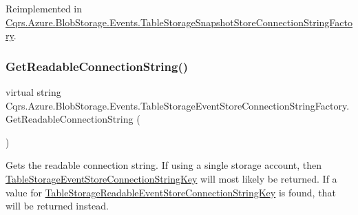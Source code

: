 Reimplemented in \hyperlink{classCqrs_1_1Azure_1_1BlobStorage_1_1Events_1_1TableStorageSnapshotStoreConnectionStringFactory_af0ddf382c977759aa45d3971fb21cbed_af0ddf382c977759aa45d3971fb21cbed}{Cqrs.\+Azure.\+Blob\+Storage.\+Events.\+Table\+Storage\+Snapshot\+Store\+Connection\+String\+Factory}.

\mbox{\label{classCqrs_1_1Azure_1_1BlobStorage_1_1Events_1_1TableStorageEventStoreConnectionStringFactory_a047e58aa30e97231dc913df350bc2446_a047e58aa30e97231dc913df350bc2446}} 
\subsubsection{\texorpdfstring{Get\+Readable\+Connection\+String()}{GetReadableConnectionString()}}
{\footnotesize\ttfamily virtual string Cqrs.\+Azure.\+Blob\+Storage.\+Events.\+Table\+Storage\+Event\+Store\+Connection\+String\+Factory.\+Get\+Readable\+Connection\+String (\begin{DoxyParamCaption}{ }\end{DoxyParamCaption})\hspace{0.3cm}{\ttfamily [virtual]}}



Gets the readable connection string. If using a single storage account, then \hyperlink{classCqrs_1_1Azure_1_1BlobStorage_1_1Events_1_1TableStorageEventStoreConnectionStringFactory_a95f8662029c8a40117e326973de936bf_a95f8662029c8a40117e326973de936bf}{Table\+Storage\+Event\+Store\+Connection\+String\+Key} will most likely be returned. If a value for \hyperlink{classCqrs_1_1Azure_1_1BlobStorage_1_1Events_1_1TableStorageEventStoreConnectionStringFactory_ac28aea2439fe0bed85d1b53c0fd8fdaf_ac28aea2439fe0bed85d1b53c0fd8fdaf}{Table\+Storage\+Readable\+Event\+Store\+Connection\+String\+Key} is found, that will be returned instead. 



